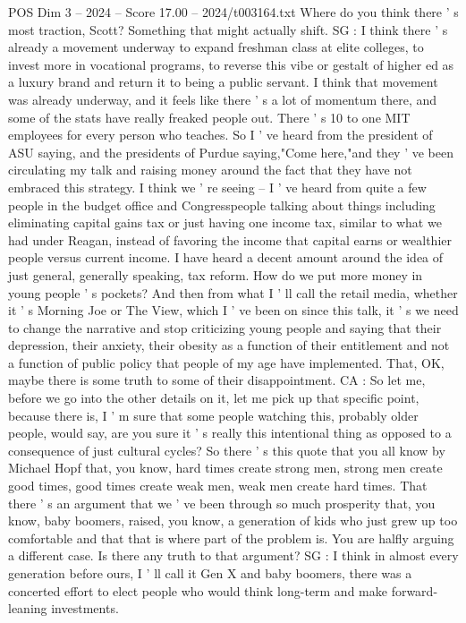 \begin{textsample}{POS Dim 3 – 2024 – Score 17.00 – 2024/t003164.txt}
Where do you think there ' s most traction, Scott?
Something that might actually shift.
SG : I think there ' s already a movement underway to expand freshman class at elite colleges, to invest more in vocational programs, to reverse this vibe or gestalt of higher ed as a luxury brand and return it to being a public servant.
I think that movement was already underway, and it feels like there ' s a lot of momentum there, and some of the stats have really freaked people out.
There ' s 10 to one MIT employees for every person who teaches.
So I ' ve heard from the president of ASU saying, and the presidents of Purdue saying,"Come here,"and they ' ve been circulating my talk and raising money around the fact that they have not embraced this strategy.
I think we ' re seeing -- I ' ve heard from quite a few people in the budget office and Congresspeople talking about things including eliminating capital gains tax or just having one income tax, similar to what we had under Reagan, instead of favoring the income that capital earns or wealthier people versus current income.
I have heard a decent amount around the idea of just general, generally speaking, tax reform.
How do we put more money in young people ' s pockets?
And then from what I ' ll call the retail media, whether it ' s Morning Joe or The View, which I ' ve been on since this talk, it ' s we need to change the narrative and stop criticizing young people and saying that their depression, their anxiety, their obesity as a function of their entitlement and not a function of public policy that people of my age have implemented.
That, OK, maybe there is some truth to some of their disappointment.
CA : So let me, before we go into the other details on it, let me pick up that specific point, because there is, I ' m sure that some people watching this, probably older people, would say, are you sure it ' s really this intentional thing as opposed to a consequence of just cultural cycles?
So there ' s this quote that you all know by Michael Hopf that, you know, hard times create strong men, strong men create good times, good times create weak men, weak men create hard times.
That there ' s an argument that we ' ve been through so much prosperity that, you know, baby boomers, raised, you know, a generation of kids who just grew up too comfortable and that that is where part of the problem is.
You are halfly arguing a different case.
Is there any truth to that argument?
SG : I think in almost every generation before ours, I ' ll call it Gen X and baby boomers, there was a concerted effort to elect people who would think long-term and make forward-leaning investments.

\end{textsample}
